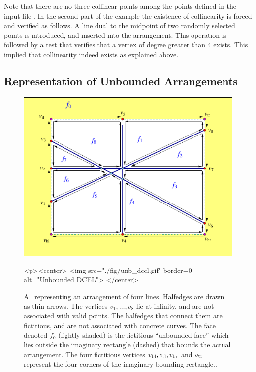 
Note that there are no three collinear points among the points defined
in the input file . In the second part of the example
the existence of collinearity is forced and verified as follows. A line
dual to the midpoint of two randomly selected points is introduced,
and inserted into the arrangement. This operation is followed by a
test that verifies that a vertex of degree greater than $4$
exists. This implied that collinearity indeed exists as explained above.

\begin{ccAdvanced}

\subsection{Representation of Unbounded Arrangements\label{arr_ssec:unb_rep}}

\begin{figure}[t]
\begin{ccTexOnly}
  \begin{center}
  \includegraphics{Arrangement_2/fig/unb_dcel}
  \end{center}
\end{ccTexOnly}
\begin{ccHtmlOnly}
  <p><center>
  <img src="./fig/unb_dcel.gif" border=0 alt="Unbounded DCEL">
  </center>
\end{ccHtmlOnly}
\caption{A \dcel\ representing an arrangement of four lines.
Halfedges are drawn as thin arrows. The vertices $v_1, \ldots, v_8$
lie at infinity, and are not associated with valid points. The
halfedges that connect them are fictitious, and are not associated
with concrete curves. The face denoted $f_0$ (lightly shaded)
is the fictitious ``unbounded face'' which lies outside the imaginary
rectangle (dashed) that bounds the actual arrangement. The four
fictitious vertices $v_{\rm bl}, v_{\rm tl}, v_{\rm br}$ and
$v_{\rm tr}$ represent the four corners of the imaginary bounding
rectangle..\label{arr_fig:unb_dcel}}
\end{figure}


\end{ccAdvanced}
